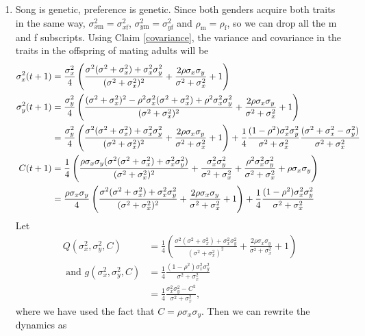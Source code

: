 \documentclass{article}
\newcommand{\x}[1]{\text{#1}}
\begin{document}
\begin{enumerate}
\item Song is genetic, preference is genetic. Since both genders acquire both traits in the same way, $\sigma_{x\x{m}}^2=\sigma_{x\x{f}}^2$,  $\sigma_{y\x{m}}^2=\sigma_{y\x{f}}^2$ and $\rho_\x{m}=\rho_\x{f}$, so we can drop all the m and f subscripts. Using Claim \ref{covariance}, the variance and covariance in the traits in the offspring of mating adults will be 
\begin{align*}
\sigma_x^2(t+1)&=\frac{\sigma_x^2}{4}\left(\frac{\sigma^2(\sigma^2+\sigma_x^2)+\sigma_x^2\sigma_y^2}{(\sigma^2+\sigma_x^2)^2}+\frac{2\rho\sigma_x\sigma_y}{\sigma^2+\sigma_x^2}+1\right) 
\\\sigma_y^2(t+1)&=\frac{\sigma_y^2}{4}\left(\frac{(\sigma^2+\sigma_x^2)^2-\rho^2\sigma_x^2(\sigma^2+\sigma_x^2)+\rho^2\sigma_x^2\sigma_y^2}{(\sigma^2+\sigma_x^2)^2}+\frac{2\rho\sigma_x\sigma_y}{\sigma^2+\sigma_x^2}+1\right) 
\notag
\\&=\frac{\sigma_y^2}{4}\left(\frac{\sigma^2(\sigma^2+\sigma_x^2)+\sigma_x^2\sigma_y^2}{(\sigma^2+\sigma_x^2)^2}+\frac{2\rho\sigma_x\sigma_y}{\sigma^2+\sigma_x^2}+1\right) +\frac{1}{4}\frac{(1-\rho^2)\sigma_x^2\sigma_y^2}{\sigma^2+\sigma_x^2}\frac{(\sigma^2+\sigma_x^2-\sigma_y^2)}{\sigma^2+\sigma_x^2}
\\C(t+1)&=\frac{1}{4}\left(\frac{\rho\sigma_x\sigma_y(\sigma^2(\sigma^2+\sigma_x^2)+\sigma_x^2\sigma_y^2)}{(\sigma^2+\sigma_x^2)^2}+\frac{\sigma_x^2\sigma_y^2}{\sigma^2+\sigma_x^2}+\frac{\rho^2\sigma_x^2\sigma_y^2}{\sigma^2+\sigma_x^2}+\rho\sigma_x\sigma_y\right)  \notag
\\&=\frac{\rho\sigma_x\sigma_y}{4}\left(\frac{\sigma^2(\sigma^2+\sigma_x^2)+\sigma_x^2\sigma_y^2}{(\sigma^2+\sigma_x^2)^2}+\frac{2\rho\sigma_x\sigma_y}{\sigma^2+\sigma_x^2}+1\right) +\frac{1}{4}\frac{(1-\rho^2)\sigma_x^2\sigma_y^2}{\sigma^2+\sigma_x^2}
\end{align*}
Let 
\begin{align*}Q(\sigma_x^2,\sigma_y^2,C)&=\frac{1}{4}\left(\frac{\sigma^2(\sigma^2+\sigma_x^2)+\sigma_x^2\sigma_y^2}{(\sigma^2+\sigma_x^2)^2}+\frac{2\rho\sigma_x\sigma_y}{\sigma^2+\sigma_x^2}+1\right)
\\\text{ and } g(\sigma_x^2,\sigma_y^2,C)&=\frac{1}{4}\frac{(1-\rho^2)\sigma_x^2\sigma_y^2}{\sigma^2+\sigma_x^2}
\\&=\frac{1}{4}\frac{\sigma_x^2\sigma_y^2-C^2}{\sigma^2+\sigma_x^2},
\end{align*}
where we have used the fact that $C=\rho\sigma_x\sigma_y$. 
Then we can rewrite the dynamics as 
\begin{align}

\end{align}
\end{enumerate}
\end{document}
